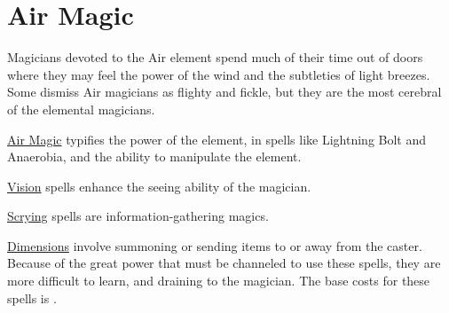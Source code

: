 \chapter{Air Magic}
\label{ch:elemental-air-magic}

Magicians devoted to the Air element spend much of their time out of doors where they may feel the power of the wind and the subtleties of light breezes. Some dismiss Air magicians as flighty and fickle, but they are the most cerebral of the elemental magicians.

\ul{Air Magic} typifies the power of the element, in spells like Lightning Bolt and Anaerobia, and the ability to manipulate the element.

\ul{Vision} spells enhance the seeing ability of the magician.

\ul{Scrying} spells are information-gathering magics.

\ul{Dimensions} involve summoning or sending items to or away from the caster. Because of the great power that must be channeled to use these spells, they are more difficult to learn, and draining to the magician. The base costs for these spells is .

